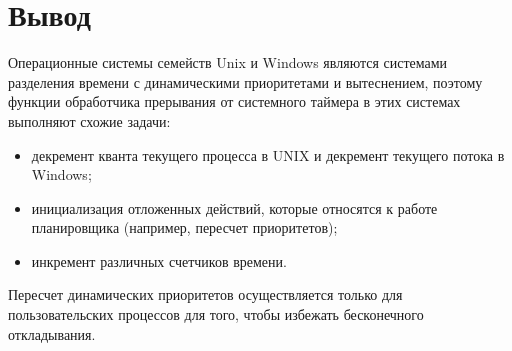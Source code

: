 \documentclass[14pt]{extarticle}
\begin{document}
\section{Вывод}

Операционные системы семейств Unix и Windows являются системами разделения
времени с динамическими приоритетами и вытеснением, поэтому функции обработчика
прерывания от системного таймера в этих системах выполняют схожие задачи:
\begin{itemize}
    \item декремент кванта текущего процесса в UNIX и декремент текущего потока
        в Windows;
    \item инициализация отложенных действий, которые относятся к работе
        планировщика (например, пересчет приоритетов);
    \item инкремент различных счетчиков времени.
\end{itemize}

Пересчет динамических приоритетов осуществляется только для пользовательских
процессов для того, чтобы избежать бесконечного откладывания.
\end{document}
